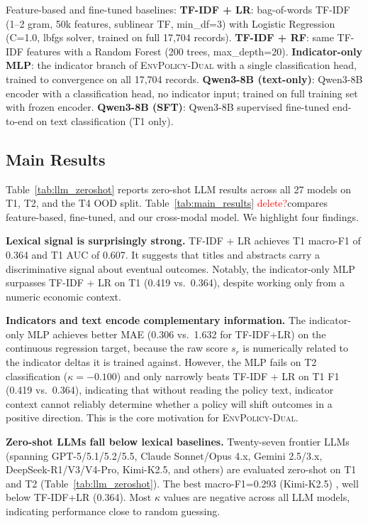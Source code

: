 \documentclass[11pt]{article}
\newcommand{\ours}{\textsc{EnvPolicy-Dual}}
\begin{document}
\noindent Feature-based and fine-tuned baselines:
\textbf{TF-IDF + LR}: bag-of-words TF-IDF (1--2 gram, 50k features, sublinear TF, min\_df=3) with Logistic Regression (C=1.0, lbfgs solver, trained on full 17{,}704 records).
\textbf{TF-IDF + RF}: same TF-IDF features with a Random Forest (200 trees, max\_depth=20).
\textbf{Indicator-only MLP}: the indicator branch of \ours{} with a single classification head, trained to convergence on all 17{,}704 records.
\textbf{Qwen3-8B (text-only)}: Qwen3-8B encoder with a classification head, no indicator input; trained on full training set with frozen encoder.
\textbf{Qwen3-8B (SFT)}: Qwen3-8B supervised fine-tuned end-to-end on text classification (T1 only).

\subsection{Main Results}





Table~\ref{tab:llm_zeroshot} reports zero-shot LLM results across all 27 models
on T1, T2, and the T4 OOD split. Table~\ref{tab:main_results} \textcolor{red}{delete?}compares
feature-based, fine-tuned, and our cross-modal model.
We highlight four findings.

\textbf{Lexical signal is surprisingly strong.} TF-IDF + LR achieves T1 macro-F1 of 0.364 and T1 AUC of 0.607. It suggests that titles and abstracts carry a discriminative signal about eventual outcomes. Notably, the indicator-only MLP surpasses TF-IDF + LR on T1 (0.419 vs.\ 0.364), despite working only from a numeric economic context.

\textbf{Indicators and text encode complementary information.} The indicator-only MLP achieves better MAE (0.306 vs.\ 1.632 for TF-IDF+LR) on the continuous regression target, because the raw score $s_r$ is numerically related to the indicator deltas it is trained against. However, the MLP fails on T2 classification ($\kappa=-0.100$) and only narrowly beats TF-IDF + LR on T1 F1 (0.419 vs.\ 0.364), indicating that without reading the policy text, indicator context cannot reliably determine whether a policy will
shift outcomes in a positive direction. This is the core motivation for \ours.


\textbf{Zero-shot LLMs fall below lexical baselines.}
Twenty-seven frontier LLMs (spanning GPT-5/5.1/5.2/5.5, Claude Sonnet/Opus 4.x, Gemini 2.5/3.x, DeepSeek-R1/V3/V4-Pro, Kimi-K2.5, and others) are evaluated zero-shot on T1 and T2 (Table~\ref{tab:llm_zeroshot}). The best macro-F1=0.293 (Kimi-K2.5) , well below TF-IDF+LR (0.364). Most $\kappa$ values are negative across all LLM models, indicating performance close to random guessing.
\end{document}
